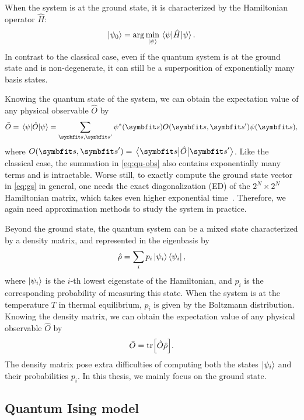 When the system is at the ground state, it is characterized by the Hamiltonian operator $\hat{H}$:
\begin{equation}
\ket{\psi_0} = \arg\min_{\ket{\psi}} \mel{\psi}{\hat{H}}{\psi}.
\label{eq:gs}
\end{equation}
In contrast to the classical case, even if the quantum system is at the ground state and is non-degenerate, it can still be a superposition of exponentially many basis states.

Knowing the quantum state of the system, we can obtain the expectation value of any physical observable $\hat{O}$ by
\begin{equation}
\bar{O} = \mel{\psi}{\hat{O}}{\psi} = \sum_{\vs, \vs'} \psi^*(\vs) O(\vs, \vs') \psi(\vs),
\label{eq:qu-obs}
\end{equation}
where $O(\vs, \vs') = \mel{\vs}{\hat{O}}{\vs'}$. Like the classical case, the summation in \cref{eq:qu-obs} also contains exponentially many terms and is intractable. Worse still, to exactly compute the ground state vector in \cref{eq:gs} in general, one needs the exact diagonalization (ED) of the $2^N \times 2^N$ Hamiltonian matrix, which takes even higher exponential time~\cite{weisse2008exact}. Therefore, we again need approximation methods to study the system in practice.

Beyond the ground state, the quantum system can be a mixed state characterized by a density matrix, and represented in the eigenbasis by
\begin{equation}
\hat{\rho} = \sum_i p_i \ket{\psi_i}\bra{\psi_i},
\end{equation}
where $\ket{\psi_i}$ is the $i$-th lowest eigenstate of the Hamiltonian, and $p_i$ is the corresponding probability of measuring this state. When the system is at the temperature $T$ in thermal equilibrium, $p_i$ is given by the Boltzmann distribution. Knowing the density matrix, we can obtain the expectation value of any physical observable $\hat{O}$ by
\begin{equation}
\bar{O} = \tr[\hat{O} \hat{\rho}].
\label{eq:dm-obs}
\end{equation}
The density matrix pose extra difficulties of computing both the states $\ket{\psi_i}$ and their probabilities $p_i$. In this thesis, we mainly focus on the ground state.

\subsection{Quantum Ising model}

